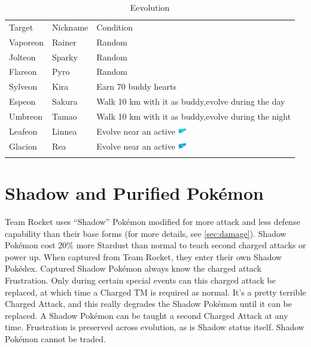 \begin{table}
\centering
\begin{tabular}{llp{}}
  Target & Nickname & Condition\\
  \Midrule
  Vaporeon & Rainer & Random\\
  Jolteon & Sparky & Random\\
  Flareon & Pyro & Random\\
  Sylveon & Kira & Earn 70 buddy hearts \\
  Espeon & Sakura & Walk 10 km with it as buddy,\newline evolve during the day\\
  Umbreon & Tamao & Walk 10 km with it as buddy,\newline evolve during the night\\
  Leafeon & Linnea & Evolve near an active \includegraphics[width=1em,height=1em]{images/rainylure.png} \\
  Glacion & Rea & Evolve near an active \includegraphics[width=1em,height=1em]{images/glaciallure.png} \\\\
\end{tabular}
  \caption{Eevolution\label{table:eevee}}
\end{table}

\section{Shadow and Purified Pokémon\label{sec:shadow}}
Team Rocket uses ``Shadow'' Pokémon modified for more attack
 and less defense capability than their base forms (for more details,
 see \autoref{sec:damage}).
Shadow Pokémon cost 20\% more Stardust than normal to teach second charged attacks or power up.
When captured from Team Rocket, they enter their own Shadow Pokédex.
Captured Shadow Pokémon always know the charged attack Frustration.
Only during certain special events can this charged attack be replaced,
 at which time a Charged TM is required as normal.
It's a pretty terrible Charged Attack, and this really degrades the
 Shadow Pokémon until it can be replaced.
A Shadow Pokémon can be taught a second Charged Attack at any time.
Frustration is preserved across evolution, as is Shadow status itself.
Shadow Pokémon cannot be traded.

